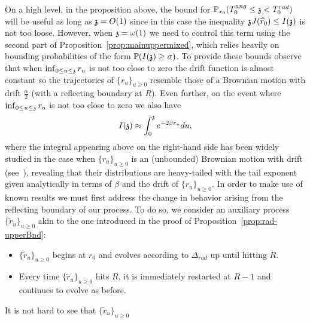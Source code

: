 On a high level, in the proposition above, the bound for $\PP_{x_0}(\tang\leq \ss<\trad)$ will be useful as long as $\ss=O(1)$ since in this case the inequality $\ss \JJ(\hatr)\leq \II{\ss}$ is not too loose. However, when $\ss=\omega(1)$ we need to control this term using the second part of Proposition~\ref{prop:mainuppermixed}, which relies heavily on bounding probabilities of the form $\PP(\II{\ss}\geq\sigma)$. To provide these bounds observe that when $\inf_{0\leq u\leq\ss}r_u$ is not too close to zero the drift function is almost constant so the trajectories of $\{r_u\}_{u\geq0}$ resemble those of a Brownian motion with drift $\tfrac{\alpha}{2}$ (with a reflecting boundary at $R$). Even further, on the event where $\inf_{0\leq u\leq\ss}r_u$ is not too close to zero we also have
\begin{equation}\label{eq:approximation}\II{\ss}\approx\int_0^\ss e^{-2\beta r_u}du,\end{equation}
where  %
the integral appearing above on the right-hand side has been widely studied in the case when $\{r_u\}_{u\geq 0}$ is an (unbounded) Brownian motion with drift (see~\cite{matsumoto2005,Yor1992,Feng2020,dufresne}), revealing that their distributions are heavy-tailed with the tail exponent given analytically in terms of $\beta$ and the drift of $\{r_u\}_{u\geq 0}$. In order to make use of known results  we must first address the change in behavior arising from the reflecting boundary of our process. To do so, we consider an auxiliary process $\{\widetilde{r}_u\}_{u\geq 0}$ akin to the one introduced in the proof of Proposition~\ref{prop:rad-upperBnd}:
    \begin{itemize}
	\item $\{\widetilde{r}_u\}_{u\geq 0}$ begins at $r_0$ and evolves according to $\Delta_{rad}$ up until hitting $R$.
	\item Every time $\{\widetilde{r}_u\}_{u\geq 0}$ hits $R$, it is immediately restarted at $R-1$ and continues to evolve as before.
\end{itemize}
It is not hard to see that $\{\widetilde{r}_u\}_{u\geq 0}$
